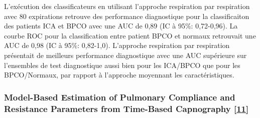 \documentclass[12pt,]{article}
\begin{document}
L'exécution des classificateurs en utilisant l'approche respiration par
respiration avec 80 expirations retrouve des performance diagnostique
pour la classificaiton des patients ICA et BPCO avec une AUC de 0,89 (IC
à 95\%: 0,72-0,96). La courbe ROC pour la classification entre patient
BPCO et normaux retrouvait une AUC de 0,98 (IC à 95\%: 0,82-1,0).
L'approche respiration par respiration présentait de meilleurs
performance diagnostique avec une AUC supérieure sur l'ensembles de test
diagnostique aussi bien pour les ICA/BPCO que pour les BPCO/Normaux, par
rapport à l'approche moyennant les caractéristiques.

\hypertarget{model-based-estimation-of-pulmonary-compliance-and-resistance-parameters-from-time-based-capnography-abid2015model}{%
\subsubsection{\texorpdfstring{Model-Based Estimation of Pulmonary
Compliance and Resistance Parameters from Time-Based Capnography
{[}\protect\hyperlink{ref-abid2015model}{11}{]}}{Model-Based Estimation of Pulmonary Compliance and Resistance Parameters from Time-Based Capnography {[}11{]}}}\label{model-based-estimation-of-pulmonary-compliance-and-resistance-parameters-from-time-based-capnography-abid2015model}}
\end{document}
